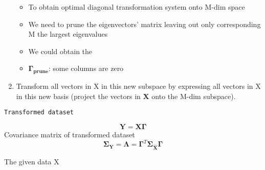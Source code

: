 \documentclass[11pt]{article}
\providecommand{\tightlist}{%
      \setlength{\itemsep}{0pt}\setlength{\parskip}{0pt}}
\begin{document}
\begin{enumerate}
  \begin{itemize}
  \tightlist
  \item
    To obtain optimal diagonal transformation system onto M-dim space
  \item
    We need to prune the eigenvectors' matrix leaving out only
    corresponding M the largest eigenvalues
  \item
    We could obtain the
  \item
    \(\mathbf{\Gamma_{prune}}\): some columns are zero
  \end{itemize}
\item
  Transform all vectors in X in this new subspace by expressing all
  vectors in X in this new basis (project the vectors in \(\mathbf{X}\)
  onto the M-dim subspace).
\end{enumerate}

    \begin{verbatim}
Transformed dataset
\end{verbatim}

\[\mathbf{Y}=\mathbf{X}\mathbf{\Gamma}\] Covariance matrix of
transformed dataset
\[\mathbf{\Sigma_\mathbf{Y}}=\mathbf{\Lambda}=\mathbf{\Gamma}^T{\mathbf{\Sigma_{\hat{\mathbf{X}}}}}\mathbf{\Gamma}\]

    The given data X
\end{document}
